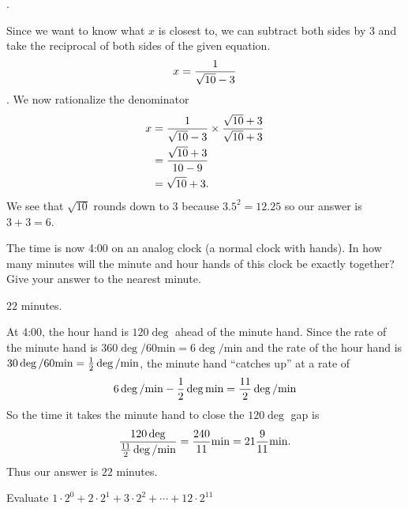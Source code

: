 \documentclass[11pt]{article}
\DeclareRobustCommand{\frac}[3][0pt]{%
  {\begingroup\hspace{#1}#2\hspace{#1}\endgroup\over\hspace{#1}#3\hspace{#1}}}
\begin{document}
\begin{answer}
.
\end{answer}
\begin{solution}
Since we want to know what $x$ is closest to, we can subtract both sides by 3 and take the reciprocal of both sides of the given equation.
$$x = \frac{1}{\sqrt{10}-3}$$.
We now rationalize the denominator
\begin{align*}
x &= \frac{1}{\sqrt{10}-3} \times \frac{\sqrt{10}+3}{\sqrt{10}+3} \\
&= \frac{\sqrt{10}+3}{10-9} \\
&= \sqrt{10}+3.
\end{align*}
We see that $\sqrt{10}$ rounds down to 3 because $3.5^2 = 12.25$ so our answer is $3+3=\boxed{6}$.
\end{solution}

\begin{problem}The time is now 4:00 on an analog clock (a normal clock with hands). In how many minutes will the minute and hour hands of this clock be exactly together? Give your answer to the nearest minute. %
\end{problem}

\begin{answer}
$\boxed{22}$ minutes.
\end{answer}
\begin{solution}
At 4:00, the hour hand is $120 \deg$ ahead of the minute hand. Since the rate of the minute hand is $360 \deg / 60 \text{min} = 6 \deg / \text{min}$ and the rate of the hour hand is $30 \deg / 60 \text{min}= \frac{1}{2} \deg / \text{min}$, the minute hand ``catches up'' at a rate of
$$6 \deg / \text{min}-\frac{1}{2} \deg \text{min} = \frac{11}{2} \deg / \text{min}$$
So the time it takes the minute hand to close the $120 \deg$ gap is
$$\frac{120 \deg}{\frac{11}{2} \deg / \text{min}} = \frac{240}{11} \text{min} = 21 \frac{9}{11} \text{min}.$$
Thus our answer is $\boxed{22}$ minutes.
\end{solution}

\begin{problem}Evaluate $1\cdot2^{0} + 2\cdot2^1 + 3\cdot2^2 +\cdots+12\cdot2^{11}$
\end{problem}
\end{document}
